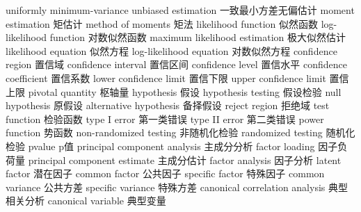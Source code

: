 {uniformly minimum-variance unbiased estimation} 
{一致最小方差无偏估计}
{moment estimation} 
{矩估计}
{method of moments} 
{矩法}
{likelihood function} 
{似然函数}
{log-likelihood function} 
{对数似然函数}
{maximum likelihood estimation} 
{极大似然估计}
{likelihood equation} 
{似然方程}
{log-likelihood equation} 
{对数似然方程}
{confidence region} 
{置信域}
{confidence interval} 
{置信区间}
{confidence level} 
{置信水平}
{confidence coefficient} 
{置信系数}
{lower confidence limit} 
{置信下限}
{upper confidence limit} 
{置信上限}
{pivotal quantity} 
{枢轴量}
{hypothesis} 
{假设}
{hypothesis testing} 
{假设检验}
{null hypothesis} 
{原假设}
{alternative hypothesis} 
{备择假设}
{reject region} 
{拒绝域}
{test function} 
{检验函数}
{type I error} 
{第一类错误}
{type II error} 
{第二类错误}
{power function} 
{势函数}
{non-randomized testing} 
{非随机化检验}
{randomized testing} 
{随机化检验}
{pvalue} 
{p值}
{principal component analysis} 
{主成分分析}
{factor loading} 
{因子负荷量}
{principal component estimate} 
{主成分估计}
{factor analysis} 
{因子分析}
{latent factor} 
{潜在因子}
{common factor} 
{公共因子}
{specific factor} 
{特殊因子}
{common variance} 
{公共方差}
{specific variance} 
{特殊方差}
{canonical correlation analysis} 
{典型相关分析}
{canonical variable} 
{典型变量}

